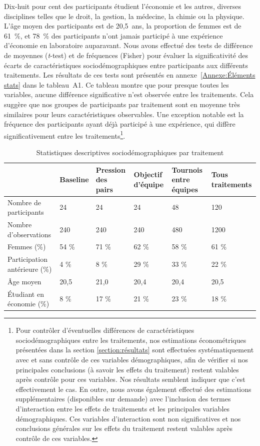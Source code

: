 \begin{Article}
\begin{refsection}[Lebourges]
Dix-huit pour cent des participants étudient l'économie et les autres,
diverses disciplines telles que le droit, la gestion, la médecine, la
chimie ou la physique. L'âge moyen des participants est de 20,5~ans, la
proportion de femmes est de 61~\%, et 78~\% des participants n'ont
jamais participé à une expérience d'économie en laboratoire auparavant.
Nous avons effectué des tests de différence de moyennes (\emph{t}-test)
et de fréquences (Fisher) pour évaluer la significativité des écarts de
caractéristiques sociodémographiques entre participants aux différents
traitements. Les résultats de ces tests sont présentés en annexe~\ref{Annexe:Éléments stats} dans le tableau~A1. Ce tableau montre que pour presque toutes les variables,
aucune différence significative n'est observée entre les traitements.
Cela suggère que nos groupes de participants par traitement sont en
moyenne très similaires pour leurs caractéristiques observables. Une
exception notable est la fréquence des participants ayant déjà participé
à une expérience, qui diffère significativement entre les
traitements\footnote{Pour contrôler d'éventuelles différences de
  caractéristiques sociodémographiques entre les traitements, nos
  estimations économétriques présentées dans la section \ref{section:résultats} sont
  effectuées systématiquement avec et sans contrôle de ces variables
  démographiques, afin de vérifier si nos principales conclusions (à
  savoir les effets du traitement) restent valables après contrôle pour
  ces variables. Nos résultats semblent indiquer que c'est effectivement
  le cas. En outre, nous avons également effectué des estimations
  supplémentaires (disponibles sur demande) avec l'inclusion des termes
  d'interaction entre les effets de traitements et les principales
  variables démographiques. Ces variables d'interaction sont non
  significatives et nos conclusions générales sur les effets du
  traitement restent valables après contrôle de ces variables.}.

\begin{table}
    \caption{Statistiques descriptives sociodémographiques par traitement}
\begin{tabular}{m{3.451cm}D{1cm}D{1cm}D{1cm}D{1cm}D{1cm}}
\toprule 
&  Baseline & Pression des pairs & Objectif d’équipe & Tournois entre équipes & Tous traitements\\
\midrule
Nombre de participants & 24 & 24 & 24 & 48 & 120\\
Nombre d’observations & 240 & 240 & 240 & 480 & 1200\\
Femmes (\%) & 54 \% & 71 \% & 62 \% & 58 \% & 61 \%\\
Participation antérieure (\%) & 4 \% & 8 \% & 29 \% & 33 \% & 22 \%\\
Âge moyen & 20,5 & 21,0 & 20,4 & 20,4 & 20,5\\
Étudiant en économie (\%) & 8 \% & 17 \% & 21 \% & 23 \% & 18 \%\\
\bottomrule
\end{tabular}
\end{table}



\end{refsection}
\end{Article}
